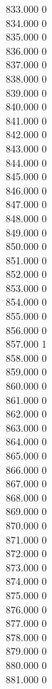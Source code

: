 { 833.000	0 \\
 834.000	0 \\
 835.000	0 \\
 836.000	0 \\
 837.000	0 \\
 838.000	0 \\
 839.000	0 \\
 840.000	0 \\
 841.000	0 \\
 842.000	0 \\
 843.000	0 \\
 844.000	0 \\
 845.000	0 \\
 846.000	0 \\
 847.000	0 \\
 848.000	0 \\
 849.000	0 \\
 850.000	0 \\
 851.000	0 \\
 852.000	0 \\
 853.000	0 \\
 854.000	0 \\
 855.000	0 \\
 856.000	0 \\
 857.000	1 \\
 858.000	0 \\
 859.000	0 \\
 860.000	0 \\
 861.000	0 \\
 862.000	0 \\
 863.000	0 \\
 864.000	0 \\
 865.000	0 \\
 866.000	0 \\
 867.000	0 \\
 868.000	0 \\
 869.000	0 \\
 870.000	0 \\
 871.000	0 \\
 872.000	0 \\
 873.000	0 \\
 874.000	0 \\
 875.000	0 \\
 876.000	0 \\
 877.000	0 \\
 878.000	0 \\
 879.000	0 \\
 880.000	0 \\
 881.000	0 \\
}
